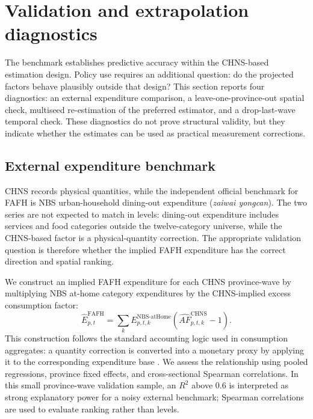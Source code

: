 \documentclass[preprint,12pt,authoryear]{elsarticle}
\begin{document}
\section{Validation and extrapolation diagnostics}
\label{sec:validation}

The benchmark establishes predictive accuracy within the CHNS-based estimation design. Policy use requires an additional question: do the projected factors behave plausibly outside that design? This section reports four diagnostics: an external expenditure comparison, a leave-one-province-out spatial check, multiseed re-estimation of the preferred estimator, and a drop-last-wave temporal check. These diagnostics do not prove structural validity, but they indicate whether the estimates can be used as practical measurement corrections.

\subsection{External expenditure benchmark}
\label{subsec:external_fafh}

CHNS records physical quantities, while the independent official benchmark for FAFH is NBS urban-household dining-out expenditure (\textit{zaiwai yongcan}). The two series are not expected to match in levels: dining-out expenditure includes services and food categories outside the twelve-category universe, while the CHNS-based factor is a physical-quantity correction. The appropriate validation question is therefore whether the implied FAFH expenditure has the correct direction and spatial ranking.

We construct an implied FAFH expenditure for each CHNS province-wave by multiplying NBS at-home category expenditures by the CHNS-implied excess consumption factor:
\begin{equation}
\widehat{E}^{\mathrm{FAFH}}_{p,t}
=\sum_k E^{\mathrm{NBS\text{-}atHome}}_{p,t,k}
\left(\widehat{AF}^{\mathrm{CHNS}}_{p,t,k}-1\right).
\label{eq:implied_fafh}
\end{equation}
This construction follows the standard accounting logic used in consumption aggregates: a quantity correction is converted into a monetary proxy by applying it to the corresponding expenditure base \citep{DeatonZaidi2002}. We assess the relationship using pooled regressions, province fixed effects, and cross-sectional Spearman correlations. In this small province-wave validation sample, an $R^2$ above 0.6 is interpreted as strong explanatory power for a noisy external benchmark; Spearman correlations are used to evaluate ranking rather than levels.
\end{document}
